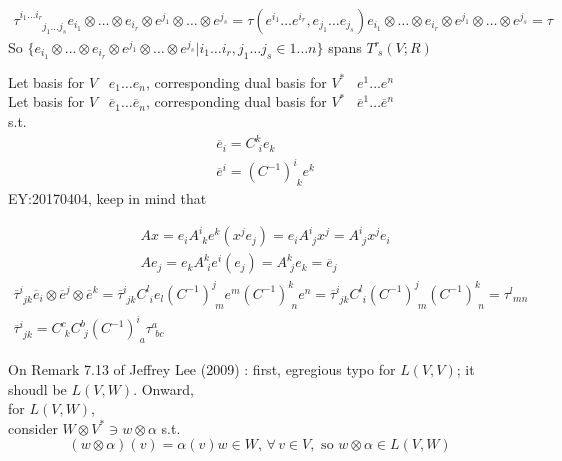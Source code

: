 \begin{proposition}
\end{proposition}







\[
\begin{gathered}
	\tau^{ i_1 \dots i_r }_{ \phantom{i_1 \dots i_r} j_1 \dots j_s} e_{i_1} \otimes \dots \otimes e_{i_r} \otimes e^{j_1}\otimes \dots \otimes e^{j_s} = \tau(e^{i_1} \dots e^{i_r}, e_{j_1} \dots e_{j_s} )e_{i_1} \otimes \dots \otimes e_{i_r} \otimes e^{j_1} \otimes \dots \otimes e^{j_s} = \tau 
\end{gathered}
\]
So $\lbrace e_{i_1}\otimes \dots \otimes e_{i_r} \otimes e^{j_1} \otimes \dots \otimes e^{j_s} | i_1 \dots i_{r}, j_1\dots j_s \in 1 \dots n \rbrace$ spans $T^r_{\,\, s}(V;R)$

  Let basis for $V$ \, $e_1 \dots e_n$, corresponding dual basis for $V^*$ \,  $e^1 \dots e^n$ \\ 
Let basis for $V$ \, $\overline{e}_1 \dots \overline{e}_n$, corresponding dual basis for $V^*$ \,  $\overline{e}^1 \dots \overline{e}^n$ \\
s.t. 
\[
\begin{aligned}
	& \overline{e}_i = C^k_{ \,\, i} e_k \\
	& \overline{e}^i = (C^{-1})^i_{ \, \, k} e^k
\end{aligned}
\]
EY:20170404, keep in mind that
 
\[
\begin{aligned}
	&	Ax = e_i A^i_{ \, \, k} e^k(x^j e_j) = e_i A^i_{ \,\,j} x^j = A^i_{ \, \, j} x^j e_i \\ 
 & Ae_j = e_k A^k_{ \, \, i} e^i (e_j) = A^k_{ \,\, j} e_k = \overline{e}_j
\end{aligned}
\]
\[
\begin{gathered}
\overline{\tau}^i_{ \,\, jk} \overline{e}_i \otimes \overline{e}^j \otimes \overline{e}^k = \overline{\tau}^i_{ \, \, jk} C^l_{ \, \, i} e_l (C^{-1})^j_{ \,\, m} e^m(C^{-1})^k_{ \, \, n} e^n = \overline{\tau}^i_{ \, \, jk} C^l_{ \, \, i } (C^{-1})^j_{ \,\, m} (C^{-1})^k_{ \,\, n} = \tau^l_{ \,\, mn}   \\
\overline{\tau}^i_{ \,\, jk} = C^c_{ \,\, k} C^b_{ \,\, j} (C^{-1})^i_{ \,\, a} \tau^a_{\,\, bc}
\end{gathered}
\]



On Remark 7.13 of Jeffrey Lee (2009) \cite{dgdt:JLee2009}:  first, egregious typo for $L(V,V)$; it shoudl be $L(V,W)$.  Onward, \\
for $L(V,W)$, \\
consider $W\otimes V^* \ni w\otimes \alpha$ s.t.
\[
(w\otimes \alpha)(v) = \alpha(v)w\in W, \, \forall \, v\in V, \text{ so } w\otimes \alpha \in L(V,W)
\]

